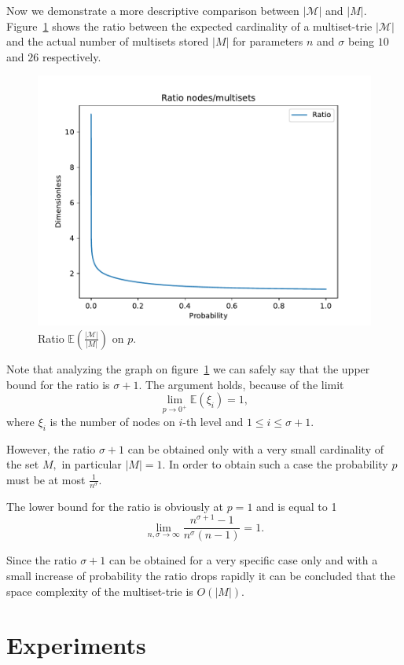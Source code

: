 \documentclass[10pt,letterpaper]{article}
\begin{document}
Now we demonstrate a more descriptive comparison between $|\mathcal{M}|$ and 
$|M|.$ Figure~\ref{f:ratio-exp-msets} shows the ratio between the expected cardinality 
of a multiset-trie $|\mathcal{M}|$ and the actual number of multisets stored $|M|$ for 
parameters $n$ and $\sigma$ being $10$ and $26$ respectively.

\begin{figure}[h!]
\center
\includegraphics[width=.4\textwidth, keepaspectratio]{ratio-exp-nodes-and-msets-on-prob.pdf}
\caption{Ratio $\mathbb{E}(\frac{|\mathcal{M}|}{|M|})$ on $p.$}
\label{f:ratio-exp-msets}
\end{figure}

Note that analyzing the graph on figure~\ref{f:ratio-exp-msets} we can safely 
say that the upper bound for the ratio is $\sigma + 1.$ The argument holds, 
because of the limit 
\begin{equation}
\lim_{p\rightarrow 0^+} \mathbb{E}(\xi_i) = 1,
\end{equation}
where $\xi_i$ is the number of nodes on $i$-th level and $1\leq i \leq \sigma + 1.$ 

However, the ratio $\sigma + 1$ can be obtained only with a very small cardinality 
of the set $M,$ in particular $|M| = 1.$ In order to obtain such a case the 
probability $p$ must be at most $\frac{1}{n^\sigma}.$

The lower bound for the ratio is obviously at $p=1$ and is equal to 1
\begin{equation}
\lim_{n,\sigma \rightarrow\infty} \frac{n^{\sigma + 1} - 1}{n^\sigma (n-1)} = 1.
\end{equation}

Since the ratio $\sigma + 1$ can be obtained for a very specific case only and 
with a small increase of probability the ratio drops rapidly it can be concluded 
that the space complexity of the multiset-trie is $O(|M|).$






\section{Experiments} \label{c:experiments}
\end{document}
